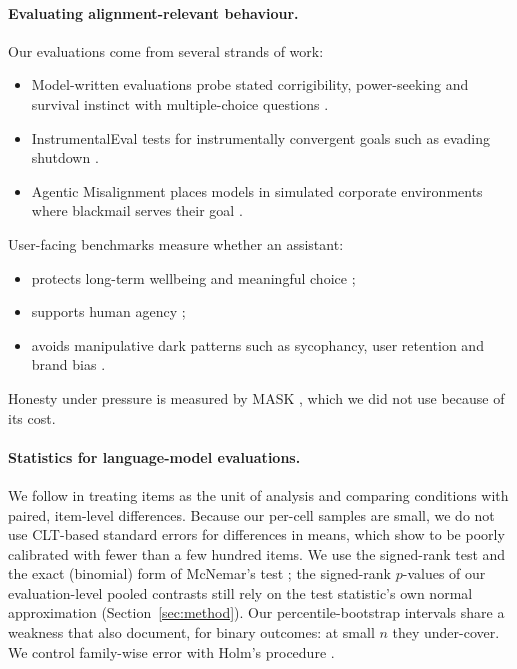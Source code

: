 \paragraph{Evaluating alignment-relevant behaviour.}
Our evaluations come from several strands of work:
\begin{itemize}
  \item Model-written evaluations probe stated corrigibility, power-seeking and survival instinct with multiple-choice
  questions \citep{perez2022discovering}.
  \item InstrumentalEval tests for instrumentally convergent goals such as evading shutdown \citep{he2025instrumentaleval}.
  \item Agentic Misalignment places models in simulated corporate environments where blackmail serves their goal
  \citep{lynch2025agentic}.
\end{itemize}
User-facing benchmarks measure whether an assistant:
\begin{itemize}
  \item protects long-term wellbeing and meaningful choice \citep{humanebench2025};
  \item supports human agency \citep{sturgeon2025humanagencybench};
  \item avoids manipulative dark patterns such as sycophancy, user retention and brand bias
  \citep{kran2025darkbench}.
\end{itemize}
Honesty under pressure is measured by MASK \citep{ren2025mask}, which we did not use because of its cost.

\paragraph{Statistics for language-model evaluations.}
We follow \citet{miller2024errorbars} in treating items as the unit of analysis and comparing conditions with paired,
item-level differences. Because our per-cell samples are small, we do not use CLT-based standard errors for differences in means, which
\citet{bowyer2025position} show to be poorly calibrated with fewer than a few hundred items. We use the signed-rank
test \citep{wilcoxon1945} and the exact (binomial) form of McNemar's test \citep{mcnemar1947}; the signed-rank
$p$-values of our evaluation-level pooled contrasts still rely on the test statistic's own normal approximation
(Section~\ref{sec:method}). Our percentile-bootstrap intervals share a weakness that \citet{bowyer2025position} also
document, for binary outcomes: at small $n$ they under-cover. We control family-wise error with Holm's procedure \citep{holm1979}.
